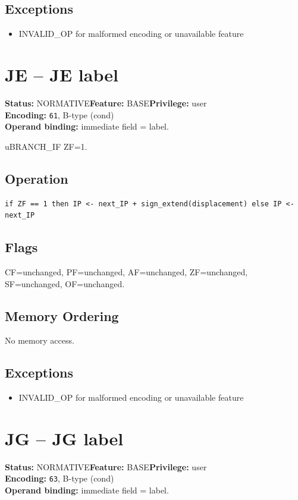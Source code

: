 \documentclass[10pt]{article}
\begin{document}
\subsection*{Exceptions}
\begin{itemize}
\item INVALID\_OP for malformed encoding or unavailable feature
\end{itemize}
\clearpage

\section{JE -- JE label}
\textbf{Status:} NORMATIVE\quad \textbf{Feature:} BASE\quad \textbf{Privilege:} user\\
\textbf{Encoding:} \texttt{61}, B-type (cond)\\
\textbf{Operand binding:} immediate field = label.

uBRANCH\_IF ZF=1.

\subsection*{Operation}
\begin{lstlisting}
if ZF == 1 then IP <- next_IP + sign_extend(displacement) else IP <- next_IP
\end{lstlisting}
\subsection*{Flags}
CF=unchanged, PF=unchanged, AF=unchanged, ZF=unchanged, SF=unchanged, OF=unchanged.
\subsection*{Memory Ordering}
No memory access.
\subsection*{Exceptions}
\begin{itemize}
\item INVALID\_OP for malformed encoding or unavailable feature
\end{itemize}
\clearpage

\section{JG -- JG label}
\textbf{Status:} NORMATIVE\quad \textbf{Feature:} BASE\quad \textbf{Privilege:} user\\
\textbf{Encoding:} \texttt{63}, B-type (cond)\\
\textbf{Operand binding:} immediate field = label.
\end{document}
